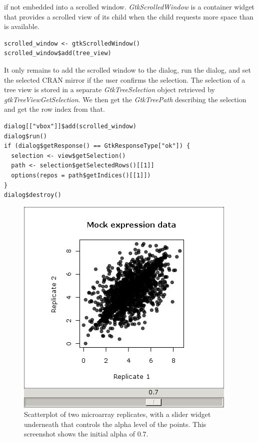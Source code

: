 \documentclass[article]{jss}
\begin{document}
if not embedded into a scrolled window. \emph{GtkScrolledWindow} is a container 
widget that provides a scrolled view of its child when the child requests more
space than is available.
\begin{verbatim}
scrolled_window <- gtkScrolledWindow()
scrolled_window$add(tree_view)
\end{verbatim}
It only remains to add the scrolled window to the dialog, run the dialog, and
set the selected CRAN mirror if the user confirms the selection. The selection
of a tree view is stored in a separate \emph{GtkTreeSelection} object retrieved
by \emph{gtkTreeViewGetSelection}. We then get the \emph{GtkTreePath}
describing the selection and get the row index from that.
\begin{verbatim}
dialog[["vbox"]]$add(scrolled_window)
dialog$run()
if (dialog$getResponse() == GtkResponseType["ok"]) {
  selection <- view$getSelection()
  path <- selection$getSelectedRows()[[1]]
  options(repos = path$getIndices()[[1]])
}
dialog$destroy()
\end{verbatim}

\begin{figure}
\begin{center}
\includegraphics[scale=0.5]{demo-alpha-random-07-3}
\caption{\label{fig:rgtk2-demo-initial}Scatterplot of two microarray replicates,
with a slider widget underneath that controls the alpha level of the
points. This screenshot shows the initial alpha of $0.7$.}
\end{center}
\end{figure}
\end{document}
